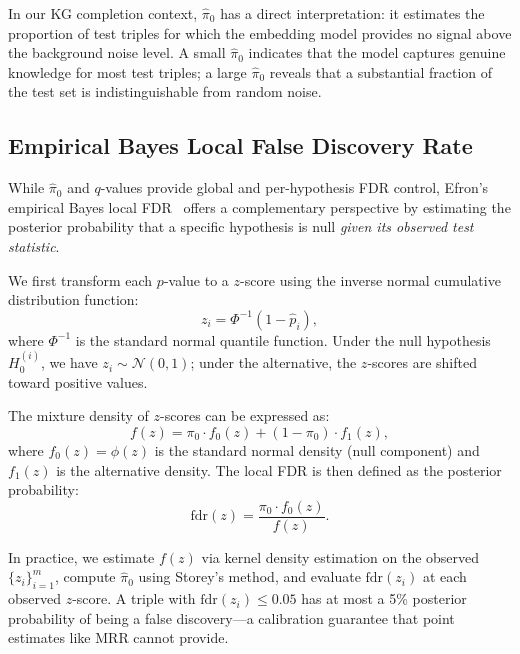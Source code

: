 In our KG completion context, $\hat{\pi}_0$ has a direct interpretation: it estimates the proportion of test triples for which the embedding model provides no signal above the background noise level.
A small $\hat{\pi}_0$ indicates that the model captures genuine knowledge for most test triples; a large $\hat{\pi}_0$ reveals that a substantial fraction of the test set is indistinguishable from random noise.

\subsection{Empirical Bayes Local False Discovery Rate}
\label{subsec:locfdr}

While $\hat{\pi}_0$ and $q$-values provide global and per-hypothesis FDR control, Efron's empirical Bayes local FDR~\cite{efron2004large, efron2007size} offers a complementary perspective by estimating the posterior probability that a specific hypothesis is null \emph{given its observed test statistic}.

We first transform each $p$-value to a $z$-score using the inverse normal cumulative distribution function:
\begin{equation}
    z_i = \Phi^{-1}(1 - \hat{p}_i),
    \label{eq:zscore}
\end{equation}
where $\Phi^{-1}$ is the standard normal quantile function. Under the null hypothesis $H_0^{(i)}$, we have $z_i \sim \mathcal{N}(0, 1)$; under the alternative, the $z$-scores are shifted toward positive values.

The mixture density of $z$-scores can be expressed as:
\begin{equation}
    f(z) = \pi_0 \cdot f_0(z) + (1 - \pi_0) \cdot f_1(z),
    \label{eq:mixture}
\end{equation}
where $f_0(z) = \phi(z)$ is the standard normal density (null component) and $f_1(z)$ is the alternative density.
The local FDR is then defined as the posterior probability:
\begin{equation}
    \text{fdr}(z) = \frac{\pi_0 \cdot f_0(z)}{f(z)}.
    \label{eq:locfdr}
\end{equation}

In practice, we estimate $f(z)$ via kernel density estimation on the observed $\{z_i\}_{i=1}^m$, compute $\hat{\pi}_0$ using Storey's method, and evaluate $\text{fdr}(z_i)$ at each observed $z$-score.
A triple with $\text{fdr}(z_i) \leq 0.05$ has at most a 5\% posterior probability of being a false discovery---a calibration guarantee that point estimates like MRR cannot provide.

